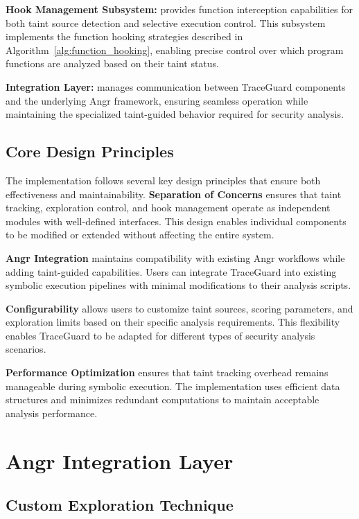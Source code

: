 \textbf{Hook Management Subsystem:} provides function interception capabilities for both taint source detection and selective execution control. This subsystem implements the function hooking strategies described in Algorithm~\ref{alg:function_hooking}, enabling precise control over which program functions are analyzed based on their taint status.

\textbf{Integration Layer:} manages communication between TraceGuard components and the underlying Angr framework, ensuring seamless operation while maintaining the specialized taint-guided behavior required for security analysis.

\subsection{Core Design Principles}

The implementation follows several key design principles that ensure both effectiveness and maintainability. \textbf{Separation of Concerns} ensures that taint tracking, exploration control, and hook management operate as independent modules with well-defined interfaces. This design enables individual components to be modified or extended without affecting the entire system.

\textbf{Angr Integration} maintains compatibility with existing Angr workflows while adding taint-guided capabilities. Users can integrate TraceGuard into existing symbolic execution pipelines with minimal modifications to their analysis scripts.

\textbf{Configurability} allows users to customize taint sources, scoring parameters, and exploration limits based on their specific analysis requirements. This flexibility enables TraceGuard to be adapted for different types of security analysis scenarios.

\textbf{Performance Optimization} ensures that taint tracking overhead remains manageable during symbolic execution. The implementation uses efficient data structures and minimizes redundant computations to maintain acceptable analysis performance.

\section{Angr Integration Layer}\label{sec:angr_integration}

\subsection{Custom Exploration Technique}


